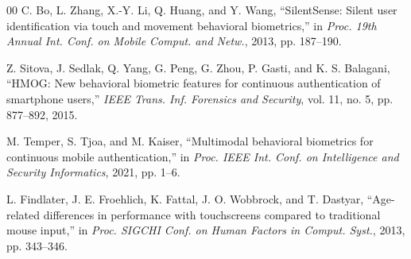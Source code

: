 \documentclass[conference]{IEEEtran}
\begin{document}
\begin{thebibliography}{00}
C. Bo, L. Zhang, X.-Y. Li, Q. Huang, and Y. Wang, ``SilentSense: Silent user identification via touch and movement behavioral biometrics,'' in \textit{Proc. 19th Annual Int. Conf. on Mobile Comput. and Netw.}, 2013, pp. 187--190.

Z. Sitova, J. Sedlak, Q. Yang, G. Peng, G. Zhou, P. Gasti, and K. S. Balagani, ``HMOG: New behavioral biometric features for continuous authentication of smartphone users,'' \textit{IEEE Trans. Inf. Forensics and Security}, vol. 11, no. 5, pp. 877--892, 2015.

M. Temper, S. Tjoa, and M. Kaiser, ``Multimodal behavioral biometrics for continuous mobile authentication,'' in \textit{Proc. IEEE Int. Conf. on Intelligence and Security Informatics}, 2021, pp. 1--6.

L. Findlater, J. E. Froehlich, K. Fattal, J. O. Wobbrock, and T. Dastyar, ``Age-related differences in performance with touchscreens compared to traditional mouse input,'' in \textit{Proc. SIGCHI Conf. on Human Factors in Comput. Syst.}, 2013, pp. 343--346.

\end{thebibliography}
\end{document}
